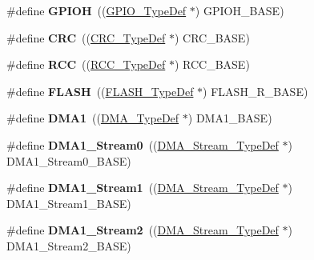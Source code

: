 \begin{DoxyCompactItemize}
\#define {\bfseries G\+P\+I\+OH}~((\hyperlink{struct_g_p_i_o___type_def}{G\+P\+I\+O\+\_\+\+Type\+Def} $\ast$) G\+P\+I\+O\+H\+\_\+\+B\+A\+SE)
\item 
\mbox{\label{group___peripheral__declaration_ga4381bb54c2dbc34500521165aa7b89b1}} 
\#define {\bfseries C\+RC}~((\hyperlink{struct_c_r_c___type_def}{C\+R\+C\+\_\+\+Type\+Def} $\ast$) C\+R\+C\+\_\+\+B\+A\+SE)
\item 
\mbox{\label{group___peripheral__declaration_ga74944438a086975793d26ae48d5882d4}} 
\#define {\bfseries R\+CC}~((\hyperlink{struct_r_c_c___type_def}{R\+C\+C\+\_\+\+Type\+Def} $\ast$) R\+C\+C\+\_\+\+B\+A\+SE)
\item 
\mbox{\label{group___peripheral__declaration_ga844ea28ba1e0a5a0e497f16b61ea306b}} 
\#define {\bfseries F\+L\+A\+SH}~((\hyperlink{struct_f_l_a_s_h___type_def}{F\+L\+A\+S\+H\+\_\+\+Type\+Def} $\ast$) F\+L\+A\+S\+H\+\_\+\+R\+\_\+\+B\+A\+SE)
\item 
\mbox{\label{group___peripheral__declaration_gacc16d2a5937f7585320a98f7f6b578f9}} 
\#define {\bfseries D\+M\+A1}~((\hyperlink{struct_d_m_a___type_def}{D\+M\+A\+\_\+\+Type\+Def} $\ast$) D\+M\+A1\+\_\+\+B\+A\+SE)
\item 
\mbox{\label{group___peripheral__declaration_ga61247dd5d594289c404dd8774202dfd8}} 
\#define {\bfseries D\+M\+A1\+\_\+\+Stream0}~((\hyperlink{struct_d_m_a___stream___type_def}{D\+M\+A\+\_\+\+Stream\+\_\+\+Type\+Def} $\ast$) D\+M\+A1\+\_\+\+Stream0\+\_\+\+B\+A\+SE)
\item 
\mbox{\label{group___peripheral__declaration_gaf7d82f110f19982d483eebc465d222b2}} 
\#define {\bfseries D\+M\+A1\+\_\+\+Stream1}~((\hyperlink{struct_d_m_a___stream___type_def}{D\+M\+A\+\_\+\+Stream\+\_\+\+Type\+Def} $\ast$) D\+M\+A1\+\_\+\+Stream1\+\_\+\+B\+A\+SE)
\item 
\mbox{\label{group___peripheral__declaration_gad0e2140b8eeec3594035f1a7bf2a7250}} 
\#define {\bfseries D\+M\+A1\+\_\+\+Stream2}~((\hyperlink{struct_d_m_a___stream___type_def}{D\+M\+A\+\_\+\+Stream\+\_\+\+Type\+Def} $\ast$) D\+M\+A1\+\_\+\+Stream2\+\_\+\+B\+A\+SE)

\end{DoxyCompactItemize}
